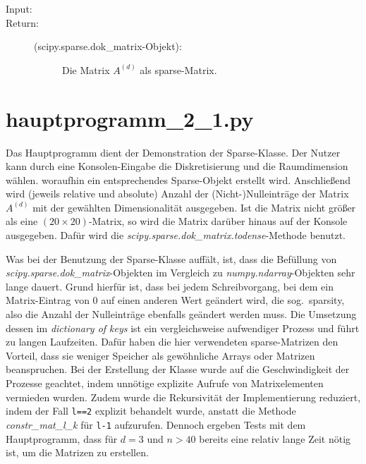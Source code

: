 \documentclass[a4paper,10pt,ngerman, oneside,openright]{sphinxmanual}
\begin{document}
\begin{fulllineitems}
\begin{fulllineitems}
\begin{description}
\item[{Input:}] \leavevmode
\item[{Return:}] \leavevmode\begin{description}
\item[{(scipy.sparse.dok\_matrix-Objekt):}] \leavevmode
Die Matrix $A^{(d)}$ als sparse-Matrix.

\end{description}

\end{description}

\end{fulllineitems}


\end{fulllineitems}

\chapter{hauptprogramm\_2\_1.py}

Das Hauptprogramm dient der Demonstration der Sparse-Klasse. Der Nutzer kann durch eine Konsolen-Eingabe die Diskretisierung und die Raumdimension wählen. woraufhin ein entsprechendes Sparse-Objekt erstellt wird. Anschließend wird (jeweils relative und absolute) Anzahl der (Nicht-)Nulleinträge der Matrix $A^{(d)}$ mit der gewählten Dimensionalität ausgegeben. Ist die Matrix nicht größer als eine $(20\times20)$-Matrix, so wird die Matrix darüber hinaus auf der Konsole ausgegeben. Dafür wird die \emph{scipy.sparse.dok\_matrix.todense}-Methode benutzt.

Was bei der Benutzung der Sparse-Klasse auffält, ist, dass die Befüllung von  \emph{scipy.sparse.dok\_matrix}-Objekten im Vergleich zu \emph{numpy.ndarray}-Objekten sehr lange dauert. Grund hierfür ist, dass bei jedem Schreibvorgang, bei dem ein Matrix-Eintrag von 0 auf einen anderen Wert geändert wird, die sog.~\glqq sparsity\grqq, also die Anzahl der Nulleinträge ebenfalls geändert werden muss. Die Umsetzung dessen im \emph{dictionary of keys} ist ein vergleichsweise aufwendiger Prozess und führt zu langen Laufzeiten. Dafür haben die hier verwendeten sparse-Matrizen den Vorteil, dass sie weniger Speicher als gewöhnliche Arrays oder Matrizen beanspruchen. Bei der Erstellung der Klasse wurde auf die Geschwindigkeit der Prozesse geachtet, indem unnötige explizite Aufrufe von Matrixelementen vermieden wurden. Zudem wurde die Rekursivität der Implementierung reduziert, indem der Fall \texttt{l==2} explizit behandelt wurde, anstatt die Methode \emph{constr\_mat\_l\_k} für \texttt{l-1} aufzurufen. Dennoch ergeben Tests mit dem Hauptprogramm, dass für $d=3$ und $n>40$ bereits eine relativ lange Zeit nötig ist, um die Matrizen zu erstellen.
\end{document}
